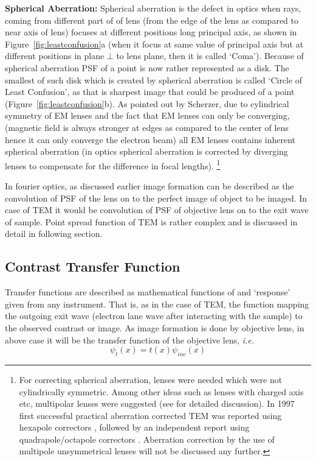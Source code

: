 \textbf{Spherical Aberration:} Spherical aberration is the defect in optics when rays, coming from different part of of lens (from the edge of the lens as compared to near axis of lens) focuses at different positions long principal axis, as shown in Figure~\ref{fig:leastconfusion}a (when it focus at same value of principal axis but at different positions in plane $\bot$ to lens plane, then it is called `Coma').
Because of spherical aberration PSF of a point is now rather represented as a disk.
The smallest of such disk which is created by spherical aberration is called `Circle of Least Confusion', as that is sharpest image that could be produced of a point (Figure~\ref{fig:leastconfusion}b).
As pointed out by Scherzer\cite{Scherzer1949}, due to cylindrical symmetry of EM lenses and the fact that EM lenses can only be converging, (magnetic field is always stronger at edges as compared to the center of lens hence it can only converge the electron beam) all EM lenses contains inherent spherical aberration (in optics spherical aberration is corrected by diverging lenses to compensate for the difference in focal lengths).
\footnote{For correcting spherical aberration, lenses were needed which were not cylindrically symmetric. Among other ideas such as lenses with charged axis etc, multipolar lenses were suggested (see \cite{Rose2009} for detailed discussion).
In 1997 first successful practical aberration corrected TEM was reported using hexapole correctors \cite{Haider1998}, followed by an independent report using quadrapole/octapole correctors \cite{Batson2002}.
Aberration correction by the use of multipole unsymmetrical lenses will not be discussed any further.}

In fourier optics, as discussed earlier image formation can be described as the convolution of PSF of the lens on to the perfect image of object  to be imaged.
In case of TEM it would be convolution of PSF of objective lens on to the exit wave of sample.
Point spread function of TEM is rather complex and is discussed in detail in following section.


\subsection{Contrast Transfer Function}
Transfer functions are described as mathematical functions of and `response' given from any instrument. 
That is, as in the case of TEM, the function mapping the outgoing exit wave (electron lane wave after interacting with the sample) to the observed contrast or image.
As image formation is done by objective lens, in above case it will be the transfer function of the objective lens, \textit{i.e.}
\begin{equation}
    \psi_t(x) = t(x) \psi_{inc}(x)
    \label{eq:exitwave1}
\end{equation}

